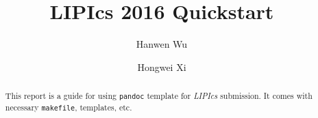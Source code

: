 \documentclass[letterpaper,USenglish]{lipics-v2016}
\title{LIPIcs 2016 Quickstart}
\author[1]{Hanwen Wu}
\affil[1]{Boston University}\\
\author[2]{Hongwei Xi}
\affil[2]{Boston University}\\
\begin{document}


\maketitle



\begin{abstract}
This report is a guide for using \texttt{pandoc} template for
\emph{LIPIcs} submission. It comes with necessary \texttt{makefile},
templates, etc.
\end{abstract}














% 



\end{document}
